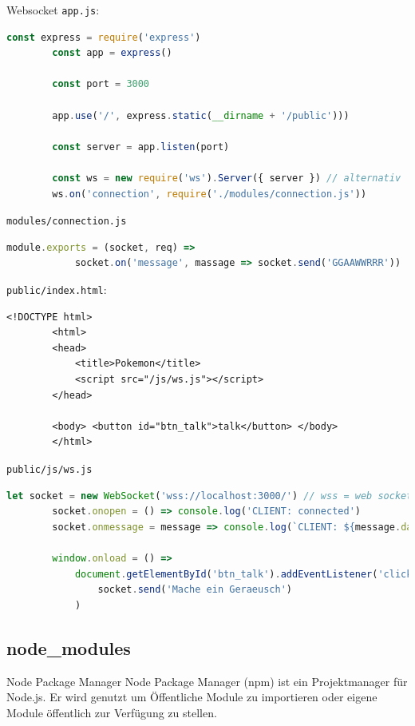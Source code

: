 \begin{example}{Websocket}
    \texttt{app.js}:
    \begin{lstlisting}[language=JavaScript]
        const express = require('express')
        const app = express()

        const port = 3000

        app.use('/', express.static(__dirname + '/public')))

        const server = app.listen(port)

        const ws = new require('ws').Server({ server }) // alternativ 'noServer: true'
        ws.on('connection', require('./modules/connection.js'))
    \end{lstlisting}

    \texttt{modules/connection.js}
    \begin{lstlisting}[language=JavaScript]
        module.exports = (socket, req) =>
            socket.on('message', massage => socket.send('GGAAWWRRR'))
    \end{lstlisting}

    \texttt{public/index.html}:
    \begin{lstlisting}[language=HTML5]
        <!DOCTYPE html>
        <html>
        <head>
            <title>Pokemon</title>
            <script src="/js/ws.js"></script>
        </head>

        <body> <button id="btn_talk">talk</button> </body>
        </html>
    \end{lstlisting}

    \texttt{public/js/ws.js}
    \begin{lstlisting}[language=JavaScript]
        let socket = new WebSocket('wss://localhost:3000/') // wss = web socket ^secure^
        socket.onopen = () => console.log('CLIENT: connected')
        socket.onmessage = message => console.log(`CLIENT: ${message.data}`)

        window.onload = () =>
            document.getElementById('btn_talk').addEventListener('click', event =>
                socket.send('Mache ein Geraeusch')
            )
    \end{lstlisting}
\end{example}

\subsection{node\_modules}

\begin{defi}{Node Package Manager}
    Node Package Manager (npm) ist ein Projektmanager für Node.js.
    Er wird genutzt um Öffentliche Module zu importieren oder eigene Module öffentlich zur Verfügung zu stellen.
\end{defi}

